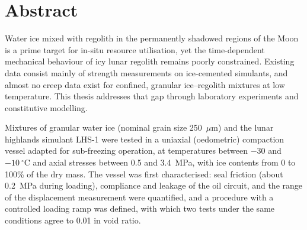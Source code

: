\documentclass{Configuration_Files/PoliMi3i_thesis}
\begin{document}


\pagestyle{empty} %
\frontmatter %


\startpreamble
\setcounter{page}{1} %

\chapter*{Abstract}
Water ice mixed with regolith in the permanently shadowed regions of the Moon is a prime target for in-situ resource utilisation, yet the time-dependent mechanical behaviour of icy lunar regolith remains poorly constrained. Existing data consist mainly of strength measurements on ice-cemented simulants, and almost no creep data exist for confined, granular ice--regolith mixtures at low temperature. This thesis addresses that gap through laboratory experiments and constitutive modelling.

Mixtures of granular water ice (nominal grain size 250~$\mu$m) and the lunar highlands simulant LHS-1 were tested in a uniaxial (oedometric) compaction vessel adapted for sub-freezing operation, at temperatures between $-30$ and $-10~^{\circ}$C and axial stresses between 0.5 and 3.4~MPa, with ice contents from 0 to 100\% of the dry mass. The vessel was first characterised: seal friction (about 0.2~MPa during loading), compliance and leakage of the oil circuit, and the range of the displacement measurement were quantified, and a procedure with a controlled loading ramp was defined, with which two tests under the same conditions agree to 0.01 in void ratio.
\end{document}
